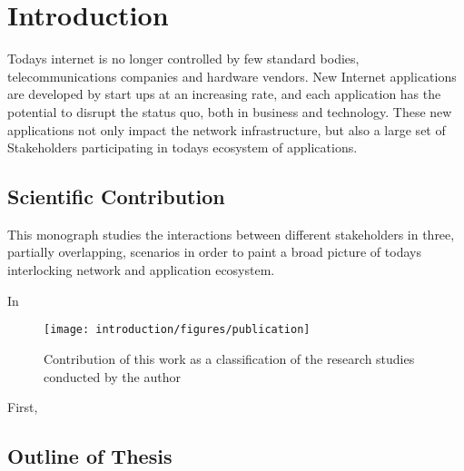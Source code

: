 \chapter{Introduction}\label{chap:introduction}

Todays internet is no longer controlled by few standard bodies, telecommunications companies and hardware vendors. 
New Internet applications are developed by start ups at an increasing rate, and each application has the potential to disrupt the status quo, both in business and technology.
These new applications not only impact the network infrastructure, but also a large set of Stakeholders participating in todays ecosystem of applications.

\section{Scientific Contribution}
This monograph studies the interactions between different stakeholders in three, partially overlapping, scenarios in order to paint a broad picture of todays interlocking network and application ecosystem.

In 

\begin{figure}
\centering
\texttt{[image: introduction/figures/publication]}
\caption{Contribution of this work as a classification of the research studies conducted by the author}\label{fig:introduction:publications}
\end{figure}

First, 
\section{Outline of Thesis}